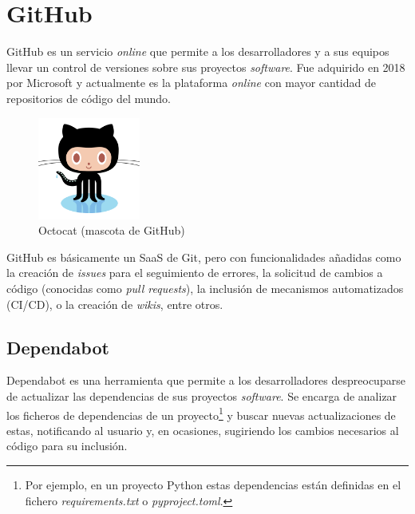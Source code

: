 
\section{GitHub}\label{sec:github}

GitHub es un servicio \emph{online} que permite a los desarrolladores y a sus equipos llevar un control de versiones sobre sus proyectos \emph{software}. Fue adquirido en 2018 por Microsoft y actualmente es la plataforma \emph{online} con mayor cantidad de repositorios de código del mundo. \emph{\parencite{Reference21}}

\begin{figure}[ht]
    \centering
    \includegraphics[width=0.3\textwidth]{Figures/octocat}
    \decoRule
    \caption[Octocat]{Octocat (mascota de GitHub) \emph{\parencite{Reference23}}}
    \label{fig:octocat}
\end{figure}

GitHub es básicamente un SaaS de Git, pero con funcionalidades añadidas como la creación de \emph{issues} para el seguimiento de errores, la solicitud de cambios a código (conocidas como \emph{pull requests}), la inclusión de mecanismos automatizados (CI/CD), o la creación de \emph{wikis}, entre otros. \emph{\parencite{Reference22}}

\subsection{Dependabot}\label{sec:dependabot}

Dependabot es una herramienta que permite a los desarrolladores despreocuparse de actualizar las dependencias de sus proyectos \emph{software}. Se encarga de analizar los ficheros de dependencias de un proyecto\footnote{Por ejemplo, en un proyecto Python estas dependencias están definidas en el fichero \emph{requirements.txt} o \emph{pyproject.toml}.} y buscar nuevas actualizaciones de estas, notificando al usuario y, en ocasiones, sugiriendo los cambios necesarios al código para su inclusión. \emph{\parencite{Reference24}}

